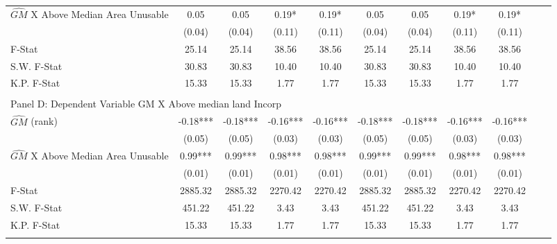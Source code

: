 \begin{table}[htbp]
\begin{threeparttable}
\begin{tabular}{l*{10}{c}}
\addlinespace
$\hat{GM}$ X Above Median Area Unusable&       0.05   &       0.05   &       0.19*  &       0.19*  &       0.05   &       0.05   &       0.19*  &       0.19*  \\
                &     (0.04)   &     (0.04)   &     (0.11)   &     (0.11)   &     (0.04)   &     (0.04)   &     (0.11)   &     (0.11)   \\
\midrule
F-Stat          &      25.14   &      25.14   &      38.56   &      38.56   &      25.14   &      25.14   &      38.56   &      38.56   \\
S.W. F-Stat     &      30.83   &      30.83   &      10.40   &      10.40   &      30.83   &      30.83   &      10.40   &      10.40   \\
K.P. F-Stat     &      15.33   &      15.33   &       1.77   &       1.77   &      15.33   &      15.33   &       1.77   &       1.77   \\
\cmidrule[\heavyrulewidth](lr){1-9} \\ \cmidrule[\heavyrulewidth](lr){1-9}
\multicolumn{8}{l}{Panel D: Dependent Variable GM X Above median land Incorp}\\
\cmidrule(lr){1-9}
$\hat{GM}$ (rank)&      -0.18***&      -0.18***&      -0.16***&      -0.16***&      -0.18***&      -0.18***&      -0.16***&      -0.16***\\
                &     (0.05)   &     (0.05)   &     (0.03)   &     (0.03)   &     (0.05)   &     (0.05)   &     (0.03)   &     (0.03)   \\
\addlinespace
$\hat{GM}$ X Above Median Area Unusable&       0.99***&       0.99***&       0.98***&       0.98***&       0.99***&       0.99***&       0.98***&       0.98***\\
                &     (0.01)   &     (0.01)   &     (0.01)   &     (0.01)   &     (0.01)   &     (0.01)   &     (0.01)   &     (0.01)   \\
\midrule
F-Stat          &    2885.32   &    2885.32   &    2270.42   &    2270.42   &    2885.32   &    2885.32   &    2270.42   &    2270.42   \\
S.W. F-Stat     &     451.22   &     451.22   &       3.43   &       3.43   &     451.22   &     451.22   &       3.43   &       3.43   \\
K.P. F-Stat     &      15.33   &      15.33   &       1.77   &       1.77   &      15.33   &      15.33   &       1.77   &       1.77   \\
\cmidrule[\heavyrulewidth](lr){1-9} \\ \cmidrule[\heavyrulewidth](lr){1-9}

\end{tabular}
\end{threeparttable}
\end{table}
